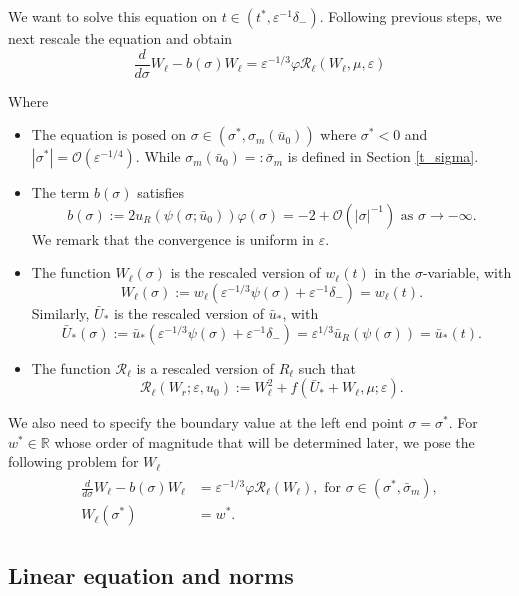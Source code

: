 \documentclass[letterpaper,11pt]{article}
\newcommand{\rmO}{\mathcal{O}}
\newcommand{\eps}{\varepsilon}
\newcommand{\Ral}{\mathcal{R}}
\numberwithin{equation}{section}
\theoremstyle{plain}
\begin{document}
We want to solve this equation on $t\in (t^*, \eps^{-1}\delta_-)$. 
Following previous steps, we next rescale the equation and obtain
\begin{equation}\label{rescl_wl}
\frac{d}{d\sigma} W_\ell - b(\sigma)W_\ell = \eps^{-1/3}\varphi \Ral_\ell(W_\ell,\mu,\eps)
\end{equation}

Where 
\begin{itemize}
\item The equation is posed on $\sigma \in (\sigma^*, \sigma_m(\bar{u}_0))$ where $\sigma^*<0$ and $|\sigma^*| = \rmO(\eps^{-1/4})$. While $\sigma_m(\bar{u}_0) =: \bar{\sigma}_m$ is defined in Section \ref{t_sigma}.

\item The term $b(\sigma)$ satisfies
\[
b(\sigma) := 2u_R(\psi(\sigma; \bar{u}_0))\varphi(\sigma) = -2 + \rmO(|\sigma|^{-1}) \text{ as } \sigma \to -\infty.
\]
We remark that the convergence is uniform in $\eps$.

\item The function $W_\ell(\sigma)$ is the rescaled version of $w_\ell(t)$ in the $\sigma$-variable, with 
\[
W_\ell(\sigma):= w_\ell(\eps^{-1/3}\psi(\sigma)+\eps^{-1}\delta_-)=w_\ell(t) .
\]
Similarly, $\bar{U}_*$ is the rescaled version of $\bar{u}_*$, with 
\[
\bar{U}_*(\sigma) := \bar{u}_*(\eps^{-1/3}\psi(\sigma)+\eps^{-1}\delta_-)= \eps^{1/3}\bar{u}_R(\psi(\sigma ) ) =\bar{u}_*(t).
\]

\item The function $\Ral_\ell$ is a rescaled version of $R_\ell$ such that 
\[
\Ral_\ell(W_r;\eps,u_0) := W_\ell^2 + f(\bar{U}_*+W_\ell, \mu;\eps).
\] 
\end{itemize}

We also need to specify the boundary value at the left end point $\sigma = \sigma^*$. For $w^* \in \mathbb{R}$ whose order of magnitude that will be determined later, we pose the following problem for $W_\ell$
\begin{align}\label{wl_bp}
\begin{split}
\frac{d}{d\sigma} W_\ell - b(\sigma)W_\ell &= \eps^{-1/3}\varphi \Ral_\ell(W_\ell), \text{ for }\sigma \in (\sigma^*, \bar{\sigma}_m),\\
W_\ell(\sigma^*) &= w^*.
\end{split}
\end{align}

\subsection{Linear equation and norms}
\end{document}
